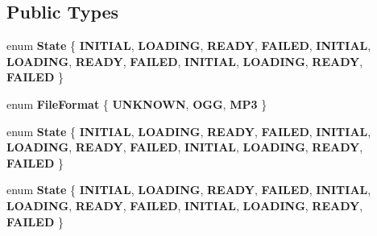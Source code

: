 \subsection*{Public Types}
\begin{DoxyCompactItemize}
\item 
\mbox{\label{classexperimental_1_1AudioCache_a032802fe2ec5950fc05e3e3a27c44daa}} 
enum {\bfseries State} \{ \newline
{\bfseries I\+N\+I\+T\+I\+AL}, 
{\bfseries L\+O\+A\+D\+I\+NG}, 
{\bfseries R\+E\+A\+DY}, 
{\bfseries F\+A\+I\+L\+ED}, 
\newline
{\bfseries I\+N\+I\+T\+I\+AL}, 
{\bfseries L\+O\+A\+D\+I\+NG}, 
{\bfseries R\+E\+A\+DY}, 
{\bfseries F\+A\+I\+L\+ED}, 
\newline
{\bfseries I\+N\+I\+T\+I\+AL}, 
{\bfseries L\+O\+A\+D\+I\+NG}, 
{\bfseries R\+E\+A\+DY}, 
{\bfseries F\+A\+I\+L\+ED}
 \}
\item 
\mbox{\label{classexperimental_1_1AudioCache_ac78efcee2778d1145ecccf1a00943807}} 
enum {\bfseries File\+Format} \{ {\bfseries U\+N\+K\+N\+O\+WN}, 
{\bfseries O\+GG}, 
{\bfseries M\+P3}
 \}
\item 
\mbox{\label{classexperimental_1_1AudioCache_a032802fe2ec5950fc05e3e3a27c44daa}} 
enum {\bfseries State} \{ \newline
{\bfseries I\+N\+I\+T\+I\+AL}, 
{\bfseries L\+O\+A\+D\+I\+NG}, 
{\bfseries R\+E\+A\+DY}, 
{\bfseries F\+A\+I\+L\+ED}, 
\newline
{\bfseries I\+N\+I\+T\+I\+AL}, 
{\bfseries L\+O\+A\+D\+I\+NG}, 
{\bfseries R\+E\+A\+DY}, 
{\bfseries F\+A\+I\+L\+ED}, 
\newline
{\bfseries I\+N\+I\+T\+I\+AL}, 
{\bfseries L\+O\+A\+D\+I\+NG}, 
{\bfseries R\+E\+A\+DY}, 
{\bfseries F\+A\+I\+L\+ED}
 \}
\item 
\mbox{\label{classexperimental_1_1AudioCache_a032802fe2ec5950fc05e3e3a27c44daa}} 
enum {\bfseries State} \{ \newline
{\bfseries I\+N\+I\+T\+I\+AL}, 
{\bfseries L\+O\+A\+D\+I\+NG}, 
{\bfseries R\+E\+A\+DY}, 
{\bfseries F\+A\+I\+L\+ED}, 
\newline
{\bfseries I\+N\+I\+T\+I\+AL}, 
{\bfseries L\+O\+A\+D\+I\+NG}, 
{\bfseries R\+E\+A\+DY}, 
{\bfseries F\+A\+I\+L\+ED}, 
\newline
{\bfseries I\+N\+I\+T\+I\+AL}, 
{\bfseries L\+O\+A\+D\+I\+NG}, 
{\bfseries R\+E\+A\+DY}, 
{\bfseries F\+A\+I\+L\+ED}
 \}
\end{DoxyCompactItemize}
